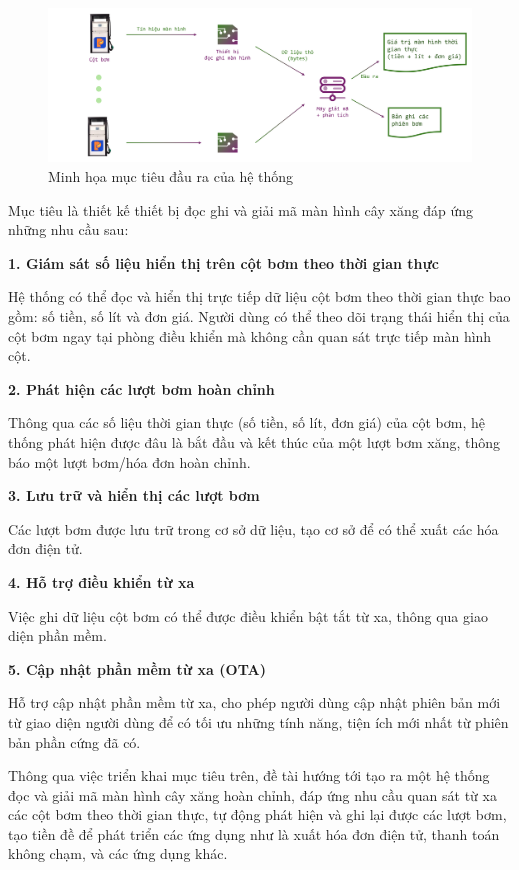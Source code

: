 \begin{figure}[!ht]
    \centering
    \includegraphics[width=1.0\linewidth]{Figures/Chap1_proj-purpose.png}
    \caption{Minh họa mục tiêu đầu ra của hệ thống}
    \label{fig:hinh1.1}
\end{figure}

Mục tiêu là thiết kế thiết bị đọc ghi và giải mã màn hình cây xăng đáp ứng những nhu cầu sau:

 \textbf{1. \quad Giám sát số liệu hiển thị trên cột bơm theo thời gian thực}

 Hệ thống có thể đọc và hiển thị trực tiếp dữ liệu cột bơm theo thời gian thực bao gồm: số tiền, số lít và đơn giá. Người dùng có thể theo dõi trạng thái hiển thị của cột bơm ngay tại phòng điều khiển mà không cần quan sát trực tiếp màn hình cột.
 

 \textbf{
    2. \quad  Phát hiện các lượt bơm hoàn chỉnh
 }

 Thông qua các số liệu thời gian thực (số tiền, số lít, đơn giá) của cột bơm, hệ thống phát hiện được đâu là bắt đầu và kết thúc của một lượt bơm xăng, thông báo một lượt bơm/hóa đơn hoàn chỉnh.


 \textbf{
    3. \quad Lưu trữ và hiển thị các lượt bơm
 }

 Các lượt bơm được lưu trữ trong cơ sở dữ liệu, tạo cơ sở để có thể xuất các hóa đơn điện tử.


 \textbf{
    4. \quad Hỗ trợ điều khiển từ xa
 }

 Việc ghi dữ liệu cột bơm có thể được điều khiển bật tắt từ xa, thông qua giao diện phần mềm.


 \textbf{
    5. \quad Cập nhật phần mềm từ xa (OTA)
 }

 Hỗ trợ cập nhật phần mềm từ xa, cho phép người dùng cập nhật phiên bản mới từ giao diện người dùng để có tối ưu những tính năng, tiện ích mới nhất từ phiên bản phần cứng đã có.

Thông qua việc triển khai mục tiêu trên, đề tài hướng tới tạo ra một hệ thống đọc và giải mã màn hình cây xăng hoàn chỉnh, đáp ứng nhu cầu quan sát từ xa các cột bơm theo thời gian thực, tự động phát hiện và ghi lại được các lượt bơm, tạo tiền đề để phát triển các ứng dụng như là xuất hóa đơn điện tử, thanh toán không chạm, và các ứng dụng khác.

